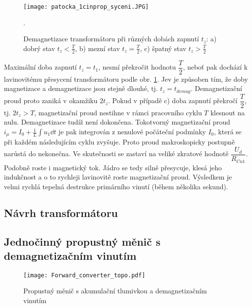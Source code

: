     \begin{figure}[ht!]
      \centering
      \texttt{[image: patocka\_1cinprop\_syceni.JPG]}
      \caption{Demagnetizace transformátoru při různých dobách zapnutí \(t_z\): a) dobrý stav 
               \(t_z < \frac{T}{2}\), b) mezní stav \(t_z = \frac{T}{2}\), c) špatný stav \(t_z > 
               \frac{T}{2}\)}.
      \label{enz:fig_fey_1cinprop_syc}
    \end{figure}
    Maximální doba zapnutí \(t_z=t_1\), nesmí překročit hodnotu \(\dfrac{T}{2}\), neboť pak 
    dochází k lavinovitému přesycení transformátoru podle obr. \ref{enz:fig_fey_1cinprop_syc}.  
    Jev je způsoben tím, že doby magnetizace a demagnetizace jsou stejně dlouhé, tj. 
    \(t_z=t_{demag}\). Demagnetizační proud proto zaniká v okamžiku \(2t_z\). Pokud v případě c) 
    doba zapnutí překročí \(\dfrac{T}{2}\), tj. \(2t_z > T\), magnetizační proud nestihne v rámci 
    pracovního cyklu \(T\) klesnout na nulu. Demagnetizace tudíž není dokončena. Tokotvorný 
    magnetizační proud \(i_\mu=I_0 + \frac{1}{L}\int{u_1\dd{t}}\) je pak integrován z nenulové 
    počáteční podmínky \(I_0\), která se při každém následujícím cyklu zvyšuje. Proto  proud 
    makroskopicky postupně narůstá do nekonečna. Ve skutečnosti se zastaví na veliké zkratové 
    hodnotě \(\dfrac{U_d}{R_{Cu1}}\). Podobně roste i magnetický tok. Jádro se tedy silně 
    přesycuje, klesá jeho indukčnost a o to rychleji lavinovitě roste magnetizační proud. 
    Výsledkem je velmi rychlá tepelná destrukce primárního vinutí (během několika sekund).      

  \subsection{Návrh transformátoru}
    
  \subsection{Jednočinný propustný měnič s demagnetizačním vinutím}
    \begin{figure}[ht!]
      \centering
      \texttt{[image: Forward\_converter\_topo.pdf]}
      \caption[Propustný měnič s akumulační tlumivkou a demagnetizačním vinutím]{Propustný měnič
               s akumulační tlumivkou  a demagnetizačním vinutím}
      \label{enz:fig_Forward_demag_topo}
    \end{figure}
    
